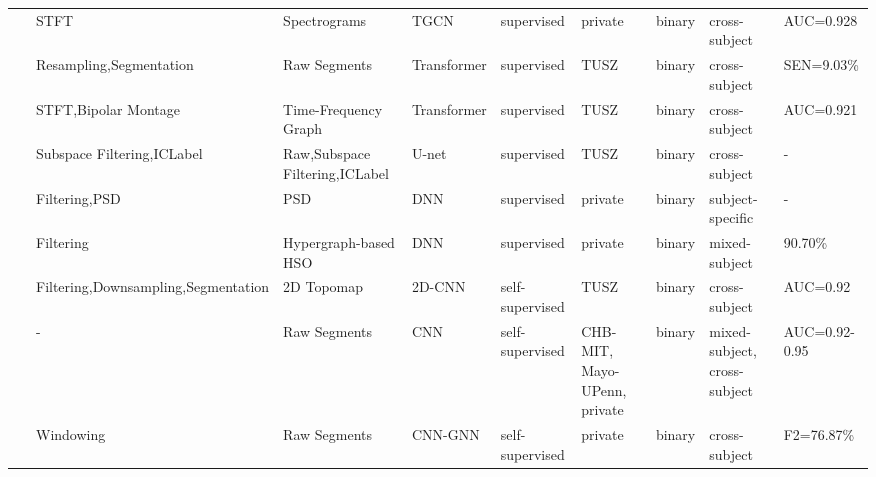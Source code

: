\begin{table*}[ht]
\begin{tabular}{p{0.4cm}p{2.8cm}p{2cm}p{1.5cm}p{1.9cm}p{1.9cm}p{0.8cm}p{1.8cm}p{2cm}}
~\cite{Seizure180} & STFT & Spectrograms & TGCN & supervised & private & binary & cross-subject & AUC=0.928 \\
~\cite{Seizure181} & Resampling,Segmentation & Raw Segments & Transformer & supervised & TUSZ & binary & cross-subject & SEN=9.03\% \\
~\cite{Seizure182} & STFT,Bipolar Montage & Time-Frequency Graph & Transformer & supervised & TUSZ & binary & cross-subject & AUC=0.921 \\
~\cite{9353630} & Subspace Filtering,\newline ICLabel  & Raw,Subspace Filtering,ICLabel & U-net & supervised & TUSZ & binary & cross-subject & - \\
~\cite{meisel2019identifying} &	Filtering,PSD & PSD & DNN & supervised & private & binary & subject-specific	& -\\
~\cite{guo2021detecting} & Filtering &	Hypergraph-based HSO &	DNN	& supervised & private &	binary & mixed-subject & 90.70\%\\
~\cite{wagh2021domain} & Filtering,Downsampling,\newline Segmentation & 2D Topomap & 2D-CNN & self-supervised & TUSZ & binary & cross-subject & AUC=0.92 \\
~\cite{zheng2022task} & - & Raw Segments & CNN & self-supervised & CHB-MIT, \newline Mayo-UPenn, \newline private & binary & mixed-subject, \newline cross-subject & AUC=0.92-0.95 \\
~\cite{chen2022brainnet} & Windowing & Raw Segments & CNN-GNN & self-supervised & private & binary & cross-subject & F2=76.87\% \\

\hline
\end{tabular}
\end{table*}


